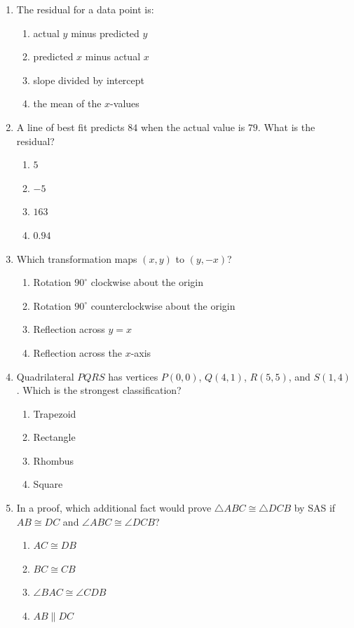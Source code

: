 \documentclass[11pt]{article}
\begin{document}
\begin{enumerate}
\item The residual for a data point is:
\begin{enumerate}[label=(\Alph*)]
\item actual $y$ minus predicted $y$ \item predicted $x$ minus actual $x$
\item slope divided by intercept \item the mean of the $x$-values
\end{enumerate}

\newpage
\item A line of best fit predicts $84$ when the actual value is $79$. What is the residual?
\begin{enumerate}[label=(\Alph*)]
\item $5$ \item $-5$ \item $163$ \item $0.94$
\end{enumerate}

\item Which transformation maps $(x,y)$ to $(y,-x)$?
\begin{enumerate}[label=(\Alph*)]
\item Rotation $90^\circ$ clockwise about the origin
\item Rotation $90^\circ$ counterclockwise about the origin
\item Reflection across $y=x$
\item Reflection across the $x$-axis
\end{enumerate}

\item Quadrilateral $PQRS$ has vertices $P(0,0)$, $Q(4,1)$, $R(5,5)$, and $S(1,4)$. Which is the strongest classification?
\begin{enumerate}[label=(\Alph*)]
\item Trapezoid \item Rectangle \item Rhombus \item Square
\end{enumerate}

\item In a proof, which additional fact would prove $\triangle ABC\cong\triangle DCB$ by SAS if $AB\cong DC$ and $\angle ABC\cong\angle DCB$?
\begin{enumerate}[label=(\Alph*)]
\item $AC\cong DB$ \item $BC\cong CB$ \item $\angle BAC\cong\angle CDB$ \item $AB\parallel DC$
\end{enumerate}


\end{enumerate}
\end{document}
